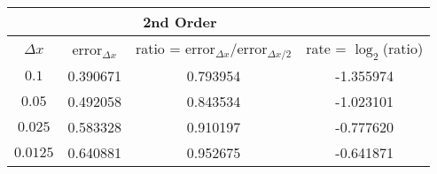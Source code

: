 \documentclass{article}
\begin{document}
\begin{table}[h]
  \begin{center}
    \begin{tabular}{cccc}
      \toprule
      \multicolumn{1}{c}{} &  \multicolumn{2}{c}{2nd Order}  \\
      \midrule
      $\Delta x$&  \hspace{3mm} error$_{\Delta x}$ &\hspace{3mm} ratio = error$_{\Delta x}$/error$_{\Delta x/2}$ \hspace{3mm} &\hspace{3mm} rate = $\log_{2}$(ratio)   \\
      $0.1$    & 0.390671 & 0.793954 & -1.355974 \\
      $0.05 $  & 0.492058 & 0.843534 & -1.023101 \\
      $0.025$  & 0.583328 & 0.910197 & -0.777620 \\
      $0.0125$ & 0.640881 & 0.952675 & -0.641871 \\
      \bottomrule
    \end{tabular}
  \end{center}
\end{table}
\end{document}
